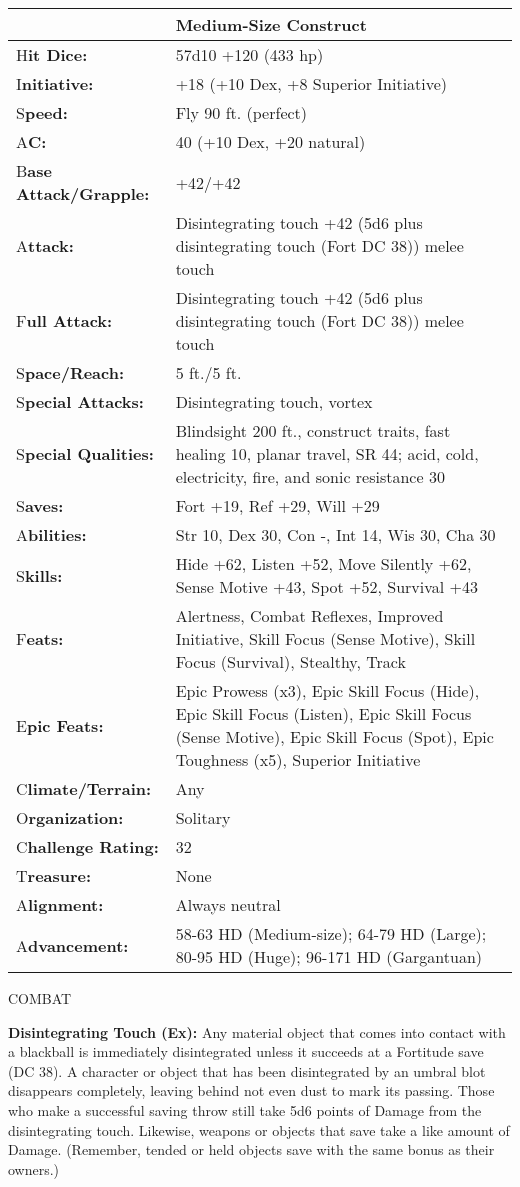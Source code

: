 \documentclass{article}
\begin{document}
{\begin{tabular}{|>{\raggedright}p{65pt}|>{\raggedright}p{261pt}|}
\hline
  & Medium-Size Construct \tabularnewline
\hline
H\textbf{it Dice:} & 57d10 +120 (433 hp) \tabularnewline
\hline
I\textbf{nitiative:} & +18 (+10 Dex, +8 Superior Initiative) \tabularnewline
\hline
S\textbf{peed:} & Fly 90 ft. (perfect) \tabularnewline
\hline
A\textbf{C:} & 40 (+10 Dex, +20 natural) \tabularnewline
\hline
B\textbf{ase Attack/Grapple:} & +42/+42\tabularnewline
\hline
A\textbf{ttack:} & Disintegrating touch +42 (5d6 plus disintegrating touch (Fort 
DC 38)) melee touch\tabularnewline
\hline
F\textbf{ull Attack:} & Disintegrating touch +42 (5d6 plus disintegrating touch 
(Fort DC 38)) melee touch\tabularnewline
\hline
S\textbf{pace/Reach:} & 5 ft./5 ft.\tabularnewline
\hline
S\textbf{pecial Attacks:} & Disintegrating touch, vortex \tabularnewline
\hline
S\textbf{pecial Qualities:} & Blindsight 200 ft., construct traits, fast healing 
10, planar travel, SR 44; acid, cold, electricity, fire, and sonic resistance 30 
\tabularnewline
\hline
S\textbf{aves:} & Fort +19, Ref +29, Will +29 \tabularnewline
\hline
A\textbf{bilities:} & Str 10, Dex 30, Con -, Int 14, Wis 30, Cha 30 \tabularnewline
\hline
S\textbf{kills:} & Hide +62, Listen +52, Move Silently +62, Sense Motive +43, Spot 
+52, Survival +43\tabularnewline
\hline
F\textbf{eats:} & Alertness, Combat Reflexes, Improved Initiative, Skill Focus 
(Sense Motive), Skill Focus (Survival), Stealthy, Track\tabularnewline
\hline
E\textbf{pic Feats:} & Epic Prowess (x3), Epic Skill Focus (Hide), Epic Skill Focus 
(Listen), Epic Skill Focus (Sense Motive), Epic Skill Focus (Spot), Epic Toughness 
(x5), Superior Initiative\tabularnewline
\hline
C\textbf{limate/Terrain:} & Any \tabularnewline
\hline
O\textbf{rganization:} & Solitary \tabularnewline
\hline
C\textbf{hallenge Rating:} & 32 \tabularnewline
\hline
T\textbf{reasure:} & None \tabularnewline
\hline
A\textbf{lignment:} & Always neutral \tabularnewline
\hline
A\textbf{dvancement:} & 58-63 HD (Medium-size); 64-79 HD (Large); 80-95 HD (Huge); 
96-171 HD (Gargantuan) \tabularnewline
\hline
\end{tabular}

COMBAT 

\textbf{Disintegrating Touch (Ex):} Any material object that comes into contact 
with a blackball is immediately disintegrated unless it succeeds at a Fortitude 
save (DC 38). A character or object that has been disintegrated by an umbral blot 
disappears completely, leaving behind not even dust to mark its passing. Those 
who make a successful saving throw still take 5d6 points of Damage from the disintegrating 
touch. Likewise, weapons or objects that save take a like amount of Damage. (Remember, 
tended or held objects save with the same bonus as their owners.) 

}
\end{document}
